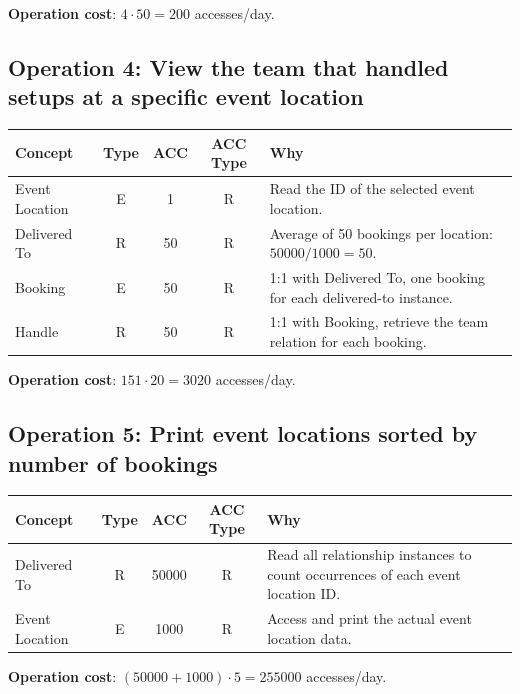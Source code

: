 \textbf{Operation cost}: $4 \cdot 50 = 200$ accesses/day.

\subsection*{Operation 4: View the team that handled setups at a specific event location}

\begin{table}[H]
    \centering
    \begin{tabular}{|l|c|c|c|p{6.3cm}|}
    \hline
    \textbf{Concept} & \textbf{Type} & \textbf{ACC} & \textbf{ACC Type} & \textbf{Why} \\
    \hline
    Event Location & E & 1 & R & Read the ID of the selected event location. \\
    \hline
    Delivered To & R & 50 & R & Average of 50 bookings per location: $50000 / 1000 = 50$. \\
    \hline
    Booking & E & 50 & R & 1:1 with Delivered To, one booking for each delivered-to instance. \\
    \hline
    Handle & R & 50 & R & 1:1 with Booking, retrieve the team relation for each booking. \\
    \hline
    \end{tabular}
\end{table}

\textbf{Operation cost}: $151 \cdot 20 = 3020$ accesses/day.

\subsection*{Operation 5: Print event locations sorted by number of bookings}

\begin{table}[H]
    \centering
    \begin{tabular}{|l|c|c|c|p{6.3cm}|}
    \hline
    \textbf{Concept} & \textbf{Type} & \textbf{ACC} & \textbf{ACC Type} & \textbf{Why} \\
    \hline
    Delivered To & R & 50000 & R & Read all relationship instances to count occurrences of each event location ID. \\
    \hline
    Event Location & E & 1000 & R & Access and print the actual event location data. \\
    \hline
    \end{tabular}
\end{table}

\textbf{Operation cost}: $(50000 + 1000) \cdot 5 = 255000$ accesses/day.

